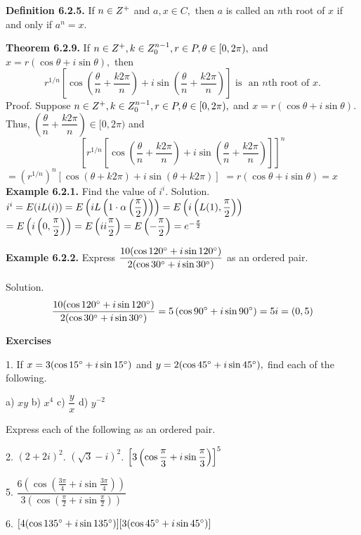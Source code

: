 \textbf{Definition 6.2.5.} If $n\in Z^{+}$ and $a,x\in C,$ then $a$ is called an $n$th root of $x$ if and only if $a^{n} = x.$\nl

\textbf{Theorem 6.2.9.} If $n\in Z^{+}, k\in Z_{0}^{n-1}, r\in P, \theta \in [0,2\pi),$ and $x = r(\cos \theta + i\sin \theta),$ then\nl
\[
r^{1/n} \left[\cos\left( \dfrac{\theta}{n}+ \dfrac{k2\pi}{n}\right) + i\sin\left( \dfrac{\theta}{n} + \dfrac{k2\pi}{n}\right)\right] \text{~is~ an~} n\text{th~root~of~} x.
\]
Proof. Suppose $n\in Z^{+}, k\in Z_{0}^{n-1}, r\in P, \theta \in [0,2\pi),$ and $x = r(\cos \theta + i\sin \theta).$\nl
Thus, $\left(\dfrac{\theta}{n} + \dfrac{k2\pi}{n}\right)\in [0, 2\pi)$ and
\[
 \left[r^{1/n} \left[\cos\left( \dfrac{\theta}{n}+ \dfrac{k2\pi}{n}\right) + i\sin\left( \dfrac{\theta}{n} + \dfrac{k2\pi}{n}\right)\right]\right]^{n}
\]
$= \left(r^{1/n}\right)^{n}\left[\cos(\theta + k2\pi) + i\sin(\theta + k2\pi)\right]$\nl
$=r(\cos\theta + i\sin \theta) = x$\\

\textbf{Example 6.2.1.} Find the value of $i^{i}.$ Solution.
$i^{i}=E(iL(i)) = E\left(iL\left(1\cdot\alpha\left(\dfrac{\pi}{2}\right)\right)\right) = E\left(i\left(L(1),\dfrac{\pi}{2}\right)\right)$ \nl
$=E\left(i\left(0,\dfrac{\pi}{2}\right)\right) = E\left(ii\dfrac{\pi}{2}\right) = E\left(-\dfrac{\pi}{2}\right) = e^{-\frac{\pi}{2}}$\nl


\textbf{Example 6.2.2.} Express $\dfrac{10(\cos 120^{\circ} + i\sin 120^{\circ})}{2(\cos 30^{\circ} + i\sin 30^{\circ})}$ as an ordered pair.

\newpage

Solution.\nl
\[
\dfrac{10(\cos 120^{\circ} + i\sin 120^{\circ})}{2(\cos 30^{\circ} + i\sin 30^{\circ})} = 5\left(\cos 90^{\circ} + i\sin 90^{\circ}\right) = 5i = (0, 5)
\]

\textbf{Exercises} \nl

1. 	If $x = 3(\cos 15^{\circ} + i\sin 15^{\circ})$ and $y = 2(\cos 45^{\circ} + i\sin 45^{\circ}),$ find each
of the following. \nl

a) $xy$ \quad b) $x^{4}$ \quad c) $\dfrac{y}{x}$ \quad d) $y^{-2}$\nl

Express each of the following as an ordered pair. \nl

2. 	$(2+2i)^{2}$. 	$(\sqrt{3} - i)^{2}$. 	$\left[3\left(\cos \dfrac{\pi}{3} + i\sin \dfrac{\pi}{3}\right)\right]^{5}$ \nl

5. 	$\dfrac{6(\cos(\frac{3\pi}{4} +i\sin \frac{3\pi}{4}))}{3(\cos(\frac{\pi}{2} +i\sin \frac{\pi}{2}))} $\nl

6. 	$[4(\cos 135^{\circ} + i\sin 135^{\circ})] [3(\cos 45^{\circ} + i \sin 45^{\circ})]$\nl

